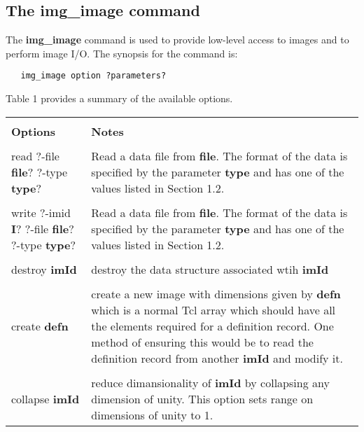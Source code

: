 \subsection{The img\_image command}
The {\bf img\_image} command is used to provide low-level access to images
and to perform image I/O.  The synopsis for the command is:
\begin{verbatim}
   img_image option ?parameters?
\end{verbatim}
Table 1 provides a summary of the available options.
\begin{table}
\begin{tabular}{|l||l|}
\hline
& \\
{\bf Options} & {\bf Notes} \\
& \\ \hline
read ?-file {\bf file}? ?-type {\bf type}? &
\begin{minipage}[t]{11.0cm}
Read a data file from {\bf file}.  The format of the data is specified
by the parameter {\bf type} and has one of the values listed in Section 1.2.
\end{minipage} \\
& \\
\begin{minipage}[t]{4.0cm}
write ?-imid {\bf I}? ?-file {\bf file}? ?-type {\bf type}?
\end{minipage} &
\begin{minipage}[t]{11.0cm}
Read a data file from {\bf file}.  The format of the data is specified
by the parameter {\bf type} and has one of the values listed in Section 1.2.
\end{minipage} \\
& \\
destroy {\bf imId} & destroy the data structure associated wtih {\bf imId}\\ 
& \\ 
create {\bf defn} &
\begin{minipage}[t]{11.0cm}
create a new image with dimensions given by {\bf defn} which is a
normal Tcl array which should have all the elements required for a
definition record.  One method of ensuring this would be to read the
definition record from another {\bf imId} and modify it.
\end{minipage} \\ 
& \\ 
collapse {\bf imId} & 
\begin{minipage}[t]{11.0cm}
reduce dimansionality of {\bf imId} by collapsing any dimension of unity.  
This option sets range on dimensions of unity to 1.

\end{minipage}
\end{tabular}
\end{table}
